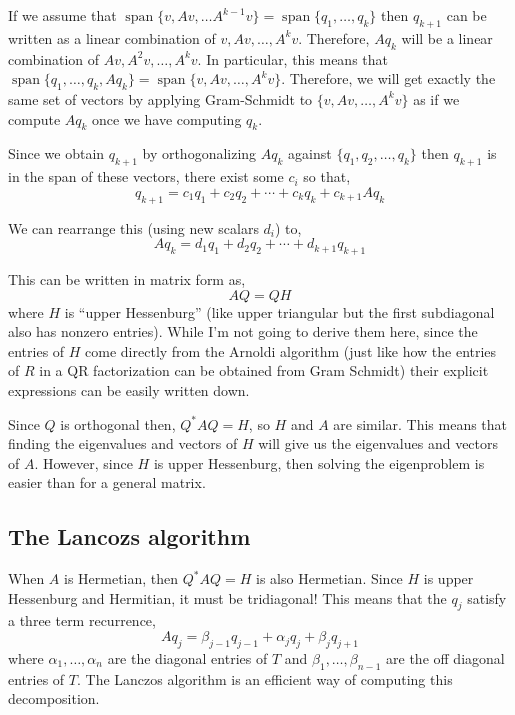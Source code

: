 If we assume that
\(\operatorname{span}\{v,Av,\ldots A^{k-1} v\}= \operatorname{span}\{q_1,\ldots, q_k\}\)
then \(q_{k+1}\) can be written as a linear combination of
\(v,Av,\ldots, A^k v\). Therefore, \(Aq_k\) will be a linear combination
of \(Av,A^2v,\ldots,A^k v\). In particular, this means that
\(\operatorname{span}\{q_1,\ldots,q_k,Aq_k\} = \operatorname{span}\{v,Av,\ldots,A^k v\}\).
Therefore, we will get exactly the same set of vectors by applying
Gram-Schmidt to \(\{v,Av,\ldots,A^kv\}\) as if we compute \(Aq_k\) once
we have computing \(q_k\).

Since we obtain \(q_{k+1}\) by orthogonalizing \(Aq_k\) against
\(\{q_1,q_2,\ldots,q_k\}\) then \(q_{k+1}\) is in the span of these
vectors, there exist some \(c_i\) so that, \[
q_{k+1} = c_1 q_1 + c_2 q_2 + \cdots + c_k q_k + c_{k+1}Aq_k
\]

We can rearrange this (using new scalars \(d_i\)) to, \[
Aq_k = d_1q_1 + d_2q_2 + \cdots + d_{k+1} q_{k+1}
\]

This can be written in matrix form as, \[
AQ = QH
\] where \(H\) is ``upper Hessenburg'' (like upper triangular but the
first subdiagonal also has nonzero entries). While I'm not going to
derive them here, since the entries of \(H\) come directly from the
Arnoldi algorithm (just like how the entries of \(R\) in a QR
factorization can be obtained from Gram Schmidt) their explicit
expressions can be easily written down.

Since \(Q\) is orthogonal then, \(Q^*AQ = H\), so \(H\) and \(A\) are
similar. This means that finding the eigenvalues and vectors of \(H\)
will give us the eigenvalues and vectors of \(A\). However, since \(H\)
is upper Hessenburg, then solving the eigenproblem is easier than for a
general matrix.

\hypertarget{the-lancozs-algorithm}{%
\subsection{The Lancozs algorithm}\label{the-lancozs-algorithm}}

When \(A\) is Hermetian, then \(Q^*AQ = H\) is also Hermetian. Since
\(H\) is upper Hessenburg and Hermitian, it must be tridiagonal! This
means that the \(q_j\) satisfy a three term recurrence, \[
Aq_j = \beta_{j-1} q_{j-1} + \alpha_j q_j + \beta_j q_{j+1}
\] where \(\alpha_1,\ldots,\alpha_n\) are the diagonal entries of \(T\)
and \(\beta_1,\ldots,\beta_{n-1}\) are the off diagonal entries of
\(T\). The Lanczos algorithm is an efficient way of computing this
decomposition.

